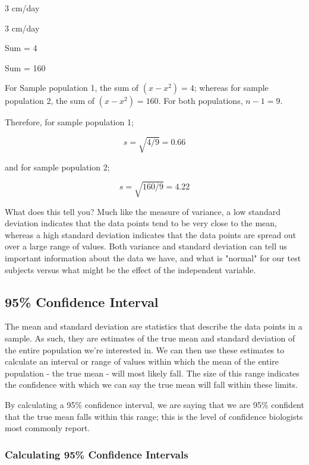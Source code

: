\documentclass[
]{book}
\begin{document}
3 cm/day

3 cm/day

Sum = 4

Sum = 160

For Sample population 1, the sum of \((x-x^{2}) = 4\); whereas for sample population 2, the sum of \((x-x^{2}) = 160\). For both populations, \(n-1 = 9\).

Therefore, for sample population 1;

\[s=\sqrt{4/9}=0.66\]

and for sample population 2;

\[s=\sqrt{160/9}=4.22\]

What does this tell you? Much like the measure of variance, a low standard deviation indicates that the data points tend to be very close to the mean, whereas a high standard deviation indicates that the data points are spread out over a large range of values. Both variance and standard deviation can tell us important information about the data we have, and what is "normal" for our test subjects versus what might be the effect of the independent variable.

\hypertarget{confidence-interval}{%
\subsection*{95\% Confidence Interval}\label{confidence-interval}}

The mean and standard deviation are statistics that describe the data points in a sample. As such, they are estimates of the true mean and standard deviation of the entire population we're interested in. We can then use these estimates to calculate an interval or range of values within which the mean of the entire population - the true mean - will most likely fall. The size of this range indicates the confidence with which we can say the true mean will fall within these limits.

By calculating a 95\% confidence interval, we are saying that we are 95\% confident that the true mean falls within this range; this is the level of confidence biologists most commonly report.

\hypertarget{calculating-95-confidence-intervals}{%
\subsubsection*{Calculating 95\% Confidence Intervals}\label{calculating-95-confidence-intervals}}
\end{document}
